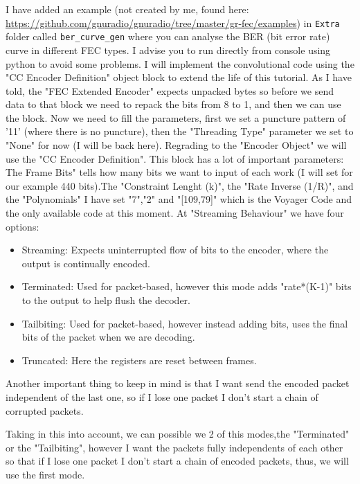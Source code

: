 \documentclass[a4paper, 10pt, conference]{ieeeconf}      %
\begin{document}
    I have added an example (not created by me, found here: \url{https://github.com/gnuradio/gnuradio/tree/master/gr-fec/examples}) in \verb|Extra| folder called \verb|ber_curve_gen| where you can analyse the BER (bit error rate) curve in different FEC types. I advise you to run directly from console using python to avoid some problems.
    I will implement the convolutional code using the "CC Encoder Definition" object block to extend the life of this tutorial. As I have told, the "FEC Extended Encoder" expects unpacked bytes so before we send data to that block we need to repack the bits from 8 to 1, and then we can use the block. Now we need to fill the parameters, first we set a puncture pattern of '11' (where there is no puncture), then the "Threading Type" parameter we set to "None" for now (I will be back here). Regrading to the "Encoder Object" we will use the "CC Encoder Definition". This block has a lot of important parameters: The Frame Bits" tells how many bits we want to input of each work (I will set for our example 440 bits).The "Constraint Lenght (k)", the "Rate Inverse (1/R)", and the "Polynomials" I have set "7","2" and "[109,79]" which is the Voyager Code and the only available code at this moment.
    At "Streaming Behaviour" we have four options:
    \begin{itemize}
        \item Streaming: Expects uninterrupted flow of bits to the encoder, where the output is continually encoded.
        \item Terminated: Used for packet-based, however this mode adds "rate*(K-1)" bits to the output to help flush the decoder.
        \item Tailbiting: Used for packet-based, however instead adding bits, uses the final bits of the packet when we are decoding.
        \item Truncated: Here the registers are reset between frames.
    \end{itemize}
    
    Another important thing to keep in mind is that I want send the encoded packet independent of the last one, so if I lose one packet I don't start a chain of corrupted packets. 
    
    Taking in this into account, we can possible we 2 of this modes,the "Terminated" or the "Tailbiting", however I want the packets fully independents of each other so that if I lose one packet I don't start a chain of encoded packets, thus, we will use the first mode.
    
\end{document}
